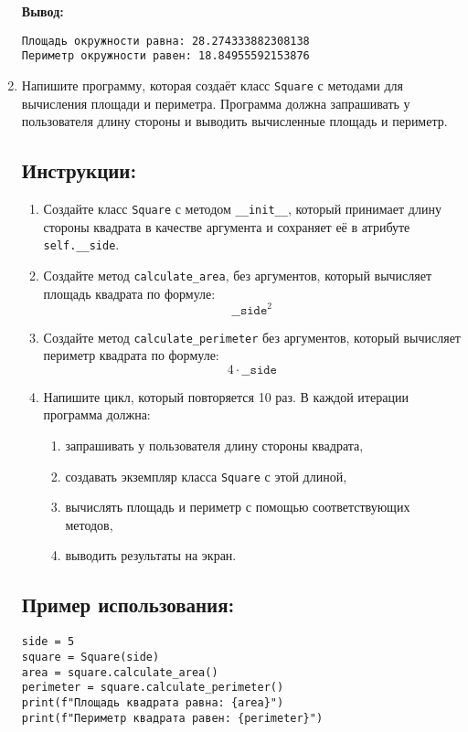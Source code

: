 \begin{enumerate}
\textbf{Вывод:}
\begin{verbatim}
Площадь окружности равна: 28.274333882308138
Периметр окружности равен: 18.84955592153876
\end{verbatim}

\item 
Напишите программу, которая создаёт класс \texttt{Square} с методами для вычисления площади
и периметра. Программа должна запрашивать у пользователя длину стороны
и выводить вычисленные площадь и периметр.

\subsection*{Инструкции:}
\begin{enumerate}
\item Создайте класс \texttt{Square} с методом
\texttt{\_\_init\_\_}, который принимает длину стороны квадрата в
качестве аргумента и сохраняет её в атрибуте \texttt{self.\_\_side}.

\item Создайте метод \texttt{calculate\_area},
без аргументов, который вычисляет площадь квадрата по формуле:
\[
\texttt{\_\_side}^2
\]

\item Создайте метод \texttt{calculate\_perimeter} без аргументов,
который вычисляет периметр квадрата по формуле:
\[
4 \cdot \texttt{\_\_side}
\]

\item Напишите цикл, который повторяется 10 раз. В каждой итерации программа должна:
\begin{enumerate}
\item запрашивать у пользователя длину стороны квадрата,
\item создавать экземпляр класса \texttt{Square} с этой длиной,
\item вычислять площадь и периметр с помощью соответствующих методов,
\item выводить результаты на экран.
\end{enumerate}
\end{enumerate}

\subsection*{Пример использования:}
\begin{verbatim}
side = 5
square = Square(side)
area = square.calculate_area()
perimeter = square.calculate_perimeter()
print(f"Площадь квадрата равна: {area}")
print(f"Периметр квадрата равен: {perimeter}")
\end{verbatim}


\end{enumerate}
